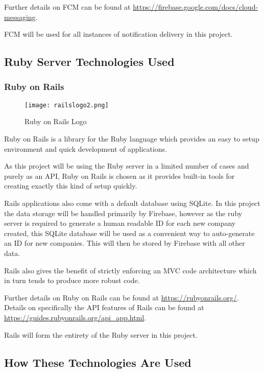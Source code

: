Further details on FCM can be found at \url{https://firebase.google.com/docs/cloud-messaging}.

FCM will be used for all instances of notification delivery in this project.

\subsection{Ruby Server Technologies Used}
\label{section:rubytechused}

\subsubsection{Ruby on Rails}

\begin{figure}[ht]
  \centering
      \texttt{[image: railslogo2.png]}
  \caption[Ruby on Rails Logo]{Ruby on Rails Logo\cite{rubyonrailslogo}}
  \label{fig:rubyonrailslogo}
\end{figure}

Ruby on Rails is a library for the Ruby language which provides an easy to setup environment and quick development of applications\cite{rubyonrails}.

As this project will be using the Ruby server in a limited number of cases and purely as an API, Ruby on Rails is chosen as it provides built-in tools for creating exactly this kind of setup quickly\cite{rubyonrailsapi}.

Rails applications also come with a default database using SQLite. In this project the data storage will be handled primarily by Firebase, however as the ruby server is required to generate a human readable ID for each new company created, this SQLite database will be used as a convenient way to auto-generate an ID for new companies. This will then be stored by Firebase with all other data\cite{rubydatabase}.

Rails also gives the benefit of strictly enforcing an MVC code architecture which in turn tends to produce more robust code\cite{rubycodestructure}.

Further details on Ruby on Rails can be found at \url{https://rubyonrails.org/}. Details on specifically the API features of Rails can be found at \url{https://guides.rubyonrails.org/api_app.html}.

Rails will form the entirety of the Ruby server in this project.

\subsection{How These Technologies Are Used}

